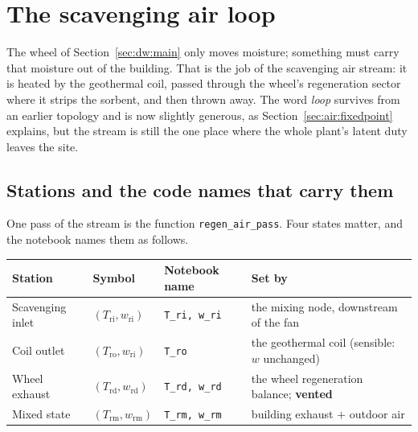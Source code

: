 %

\section{The scavenging air loop}
\label{sec:air:scav}

The wheel of Section~\ref{sec:dw:main} only moves moisture; something must
carry that moisture out of the building. That is the job of the scavenging
air stream: it is heated by the geothermal coil, passed through the wheel's
regeneration sector where it strips the sorbent, and then thrown away. The
word \emph{loop} survives from an earlier topology and is now slightly
generous, as Section~\ref{sec:air:fixedpoint} explains, but the stream is
still the one place where the whole plant's latent duty leaves the site.

\subsection{Stations and the code names that carry them}
\label{sec:air:stations}

One pass of the stream is the function \texttt{regen\_air\_pass}. Four states
matter, and the notebook names them as follows.

\begin{center}
\begin{tabular}{@{}llll@{}}
\toprule
Station & Symbol & Notebook name & Set by \\
\midrule
Scavenging inlet   & $(T_{\mathrm{ri}},w_{\mathrm{ri}})$ & \texttt{T\_ri, w\_ri} & the mixing node, downstream of the fan \\
Coil outlet        & $(T_{\mathrm{ro}},w_{\mathrm{ri}})$ & \texttt{T\_ro}        & the geothermal coil (sensible: $w$ unchanged) \\
Wheel exhaust      & $(T_{\mathrm{rd}},w_{\mathrm{rd}})$ & \texttt{T\_rd, w\_rd} & the wheel regeneration balance; \textbf{vented} \\
Mixed state        & $(T_{\mathrm{rm}},w_{\mathrm{rm}})$ & \texttt{T\_rm, w\_rm} & building exhaust $+$ outdoor air \\
\bottomrule
\end{tabular}
\end{center}


